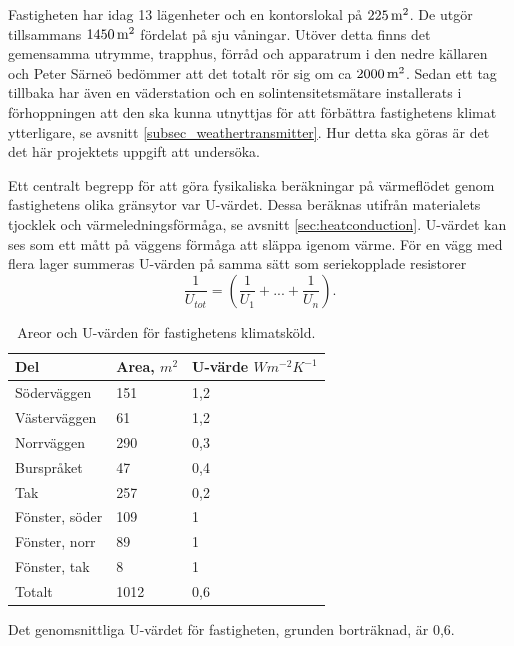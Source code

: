 Fastigheten har idag 13 lägenheter och en kontorslokal på $\unit[225]{m^2}$. De utgör tillsammans $\unit[1450]{m^2}$ fördelat på sju våningar. Utöver detta finns det gemensamma utrymme, trapphus, förråd och apparatrum i den nedre källaren och Peter Särneö\cite{petersarneo} bedömmer att det totalt rör sig om ca $\unit[2000]{m^2}$. Sedan ett tag tillbaka har även en väderstation och en solintensitetsmätare installerats i förhoppningen att den ska kunna utnyttjas för att förbättra fastighetens klimat ytterligare, se avsnitt \ref{subsec_weathertransmitter}. Hur detta ska göras är det det här projektets uppgift att undersöka.

Ett centralt begrepp för att göra fysikaliska beräkningar på värmeflödet genom fastighetens olika gränsytor var U-värdet. Dessa beräknas utifrån materialets tjocklek och värmeledningsförmåga, se avsnitt \ref{sec:heatconduction}. U-värdet kan ses som ett mått på väggens förmåga att släppa igenom värme. För en vägg med flera lager summeras U-värden på samma sätt som seriekopplade resistorer
\begin{equation}
\label{eq:uvalue}
\frac{1}{U_{tot}}= (\frac{1}{U_1}+...+\frac{1}{U_n}).
\end{equation}

\begin{table}[hbtp]
\centering
\caption{Areor och U-värden för fastighetens klimatsköld.}
\label{tbl:uvalue}

\begin{tabular}
{|l|l|l|}
\hline
\textbf{Del} & \textbf{Area, $\unit{m^2}$} & \parbox{2 cm}{\textbf{U-värde\\$\unit{Wm^{-2}K^{-1}}$}} \\
\hline
Söderväggen &  151 & 1,2 \\ 
Västerväggen & 61 & 1,2 \\
Norrväggen & 290 & 0,3 \\
Burspråket & 47 & 0,4 \\
Tak & 257 & 0,2 \\
\hline
Fönster, söder & 109 & 1 \\
Fönster, norr & 89 & 1 \\
Fönster, tak & 8 & 1 \\
\hline
Totalt & 1012 & 0,6\\
\end{tabular}
\end{table}

Det genomsnittliga U-värdet för fastigheten, grunden borträknad, är 0,6.

